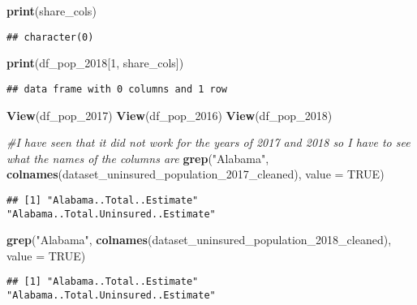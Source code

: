 \documentclass[
]{article}
\newenvironment{Shaded}{\begin{snugshade}}{\end{snugshade}}
\newcommand{\AttributeTok}[1]{\textcolor[rgb]{0.13,0.29,0.53}{#1}}
\newcommand{\CommentTok}[1]{\textcolor[rgb]{0.56,0.35,0.01}{\textit{#1}}}
\newcommand{\ConstantTok}[1]{\textcolor[rgb]{0.56,0.35,0.01}{#1}}
\newcommand{\DecValTok}[1]{\textcolor[rgb]{0.00,0.00,0.81}{#1}}
\newcommand{\FunctionTok}[1]{\textcolor[rgb]{0.13,0.29,0.53}{\textbf{#1}}}
\newcommand{\NormalTok}[1]{#1}
\newcommand{\StringTok}[1]{\textcolor[rgb]{0.31,0.60,0.02}{#1}}
\begin{document}
\begin{Shaded}
\begin{Highlighting}[]
\FunctionTok{print}\NormalTok{(share\_cols)}
\end{Highlighting}
\end{Shaded}

\begin{verbatim}
## character(0)
\end{verbatim}

\begin{Shaded}
\begin{Highlighting}[]
\FunctionTok{print}\NormalTok{(df\_pop\_2018[}\DecValTok{1}\NormalTok{, share\_cols])}
\end{Highlighting}
\end{Shaded}

\begin{verbatim}
## data frame with 0 columns and 1 row
\end{verbatim}

\begin{Shaded}
\begin{Highlighting}[]
\FunctionTok{View}\NormalTok{(df\_pop\_2017)}
\FunctionTok{View}\NormalTok{(df\_pop\_2016)}
\FunctionTok{View}\NormalTok{(df\_pop\_2018)}

\CommentTok{\#I have seen that it did not work for the years of 2017 and 2018 so I have to see what the names of the columns are}
\FunctionTok{grep}\NormalTok{(}\StringTok{"Alabama"}\NormalTok{, }\FunctionTok{colnames}\NormalTok{(dataset\_uninsured\_population\_2017\_cleaned), }\AttributeTok{value =} \ConstantTok{TRUE}\NormalTok{)}
\end{Highlighting}
\end{Shaded}

\begin{verbatim}
## [1] "Alabama..Total..Estimate"           "Alabama..Total.Uninsured..Estimate"
\end{verbatim}

\begin{Shaded}
\begin{Highlighting}[]
\FunctionTok{grep}\NormalTok{(}\StringTok{"Alabama"}\NormalTok{, }\FunctionTok{colnames}\NormalTok{(dataset\_uninsured\_population\_2018\_cleaned), }\AttributeTok{value =} \ConstantTok{TRUE}\NormalTok{)}
\end{Highlighting}
\end{Shaded}

\begin{verbatim}
## [1] "Alabama..Total..Estimate"           "Alabama..Total.Uninsured..Estimate"
\end{verbatim}
\end{document}
